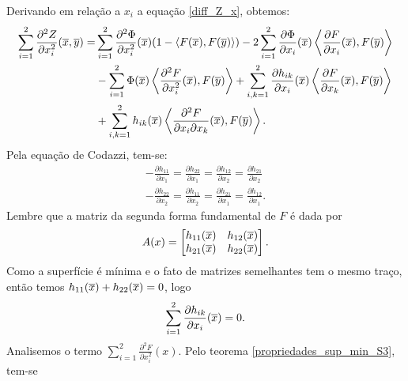 \begin{demonstracao}
	Derivando em rela\c c\~ao a $x_i$ a equação \eqref{diff_Z_x}, obtemos:
	\begin{eqnarray}\label{Z_seg_dev_x}
	\begin{aligned}
	\sum_{i=1}^2\frac{\partial^2 Z}{\partial x_i^2}(\overline{x},\overline{y}) = &
	\sum_{i=1}^2\frac{\partial^2 \Phi}{\partial x_i^2}(\overline{x})
	(1 - \langle F(\overline{x}), F(\overline{y}) \rangle) -
	2\sum_{i=1}^2\frac{\partial \Phi}{\partial x_i}(\overline{x}) 
	\left\langle \frac{\partial F}{\partial x_i}(\overline{x}), F(\overline{y}) \right\rangle \\
	& - \sum_{i=1}^2\Phi(\overline{x}) \left\langle\frac{\partial^2 F}{\partial x_i^2}(\overline{x}),F(\overline{y})
	\right\rangle + \sum_{i,k=1}^2\frac{\partial h_{ik}}{\partial x_i}(\overline{x})
	\left\langle \frac{\partial F}{\partial x_k}(\overline{x}), F(\overline{y})\right\rangle \\ 
	&+ \sum_{i,k=1}^2h_{ik}(\overline{x})\left\langle
	\frac{\partial^2 F}{\partial x_i \partial x_k}(\overline{x}), F(\overline{y})\right\rangle.
	\end{aligned}
	\end{eqnarray}
	Pela equação de Codazzi, tem-se:
	\begin{equation}\label{codazzi_eq}
	\begin{split}
	-\frac{\partial h_{11}}{\partial x_1} = \frac{\partial h_{22}}{\partial x_1} = 
	\frac{\partial h_{12}}{\partial x_2} = \frac{\partial h_{21}}{\partial x_2} \\
	-\frac{\partial h_{22}}{\partial x_2} = \frac{\partial h_{11}}{\partial x_2} = 
	\frac{\partial h_{21}}{\partial x_1} = \frac{\partial h_{12}}{\partial x_1}.
	\end{split}		
	\end{equation}
	Lembre que a matriz da segunda forma fundamental de $F$ \'e dada
	por
	\begin{equation*}
	A(x) = \left[\begin{matrix}
	h_{11}(\overline{x}) & h_{12}(\overline{x}) \\
	h_{21}(\overline{x}) & h_{22}(\overline{x})
	\end{matrix}\right].
	\end{equation*}
	Como a superfície é m\'inima e o fato de matrizes semelhantes tem 
	o mesmo tra\c co, então temos $h_{11}(\overline{x}) + h_{22}(\overline{x}) = 0$, logo
	\begin{eqnarray}\label{eq:codazzi}
	\sum_{i=1}^2 \frac{\partial h_{ik}}{\partial x_i}(\overline{x}) = 0.
	\end{eqnarray}
	Analisemos o termo $\sum_{i=1}^2 \frac{\partial^2 F}{\partial x_i^2}(x)$. 
	Pelo teorema \ref{propriedades_sup_min_S3}, tem-se

\end{demonstracao}
